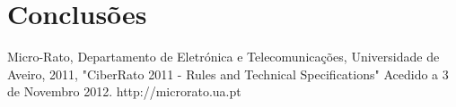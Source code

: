 \documentclass[citeauthoryear]{llncs} %
\begin{document}
\section{Conclusões}

\begingroup
\renewcommand\refname{Referências}
\begin{thebibliography}{}

Micro-Rato, Departamento de Eletrónica e Telecomunicações, Universidade de Aveiro, 2011, "CiberRato 2011 - Rules and Technical Specifications" Acedido a 3 de Novembro 2012. http://microrato.ua.pt
\end{thebibliography}
\endgroup
\end{document}
